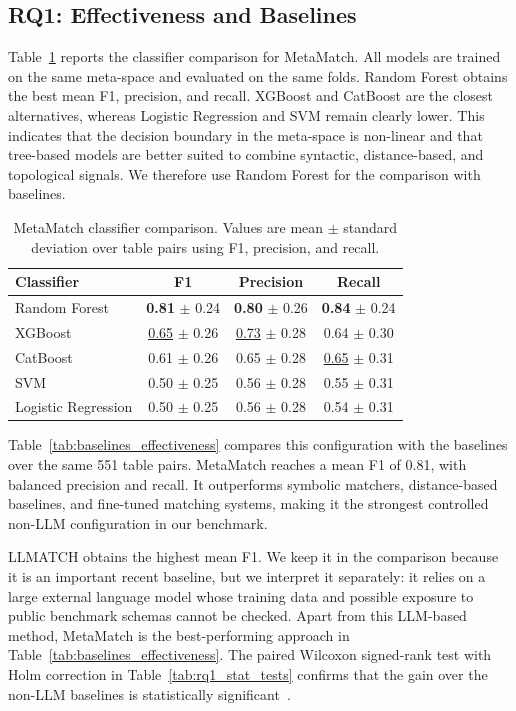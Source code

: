 \documentclass[sigconf, nonacm]{acmart}
\newcommand{\best}[1]{\textbf{#1}}
\newcommand{\second}[1]{\underline{#1}}
\begin{document}
\subsection{RQ1: Effectiveness and Baselines}

Table~\ref{tab:metaspace_classifiers} reports the classifier comparison for MetaMatch. All models are trained on the same meta-space and evaluated on the same folds. Random Forest obtains the best mean F1, precision, and recall. XGBoost and CatBoost are the closest alternatives, whereas Logistic Regression and SVM remain clearly lower. This indicates that the decision boundary in the meta-space is non-linear and that tree-based models are better suited to combine syntactic, distance-based, and topological signals. We therefore use Random Forest for the comparison with baselines.

\begin{table}[!t]
\centering
\caption{MetaMatch classifier comparison. Values are mean $\pm$ standard deviation over table pairs using F1, precision, and recall.}
\label{tab:metaspace_classifiers}
\begin{tabular}{lccc}
\toprule
\textbf{Classifier} & \textbf{F1} & \textbf{Precision} & \textbf{Recall} \\
\midrule
Random Forest & \best{0.81} $\pm$ 0.24 & \best{0.80} $\pm$ 0.26 & \best{0.84} $\pm$ 0.24 \\
XGBoost & \second{0.65} $\pm$ 0.26 & \second{0.73} $\pm$ 0.28 & 0.64 $\pm$ 0.30 \\
CatBoost & 0.61 $\pm$ 0.26 & 0.65 $\pm$ 0.28 & \second{0.65} $\pm$ 0.31 \\
SVM & 0.50 $\pm$ 0.25 & 0.56 $\pm$ 0.28 & 0.55 $\pm$ 0.31 \\
Logistic Regression & 0.50 $\pm$ 0.25 & 0.56 $\pm$ 0.28 & 0.54 $\pm$ 0.31 \\
\bottomrule
\end{tabular}
\end{table}

Table~\ref{tab:baselines_effectiveness} compares this configuration with the baselines over the same 551 table pairs. MetaMatch reaches a mean F1 of 0.81, with balanced precision and recall. It outperforms symbolic matchers, distance-based baselines, and fine-tuned matching systems, making it the strongest controlled non-LLM configuration in our benchmark.

LLMATCH obtains the highest mean F1. We keep it in the comparison because it is an important recent baseline, but we interpret it separately: it relies on a large external language model whose training data and possible exposure to public benchmark schemas cannot be checked. Apart from this LLM-based method, MetaMatch is the best-performing approach in Table~\ref{tab:baselines_effectiveness}. The paired Wilcoxon signed-rank test with Holm correction in Table~\ref{tab:rq1_stat_tests} confirms that the gain over the non-LLM baselines is statistically significant~\cite{wilcoxon1945individual,holm1979simple}.
\end{document}
